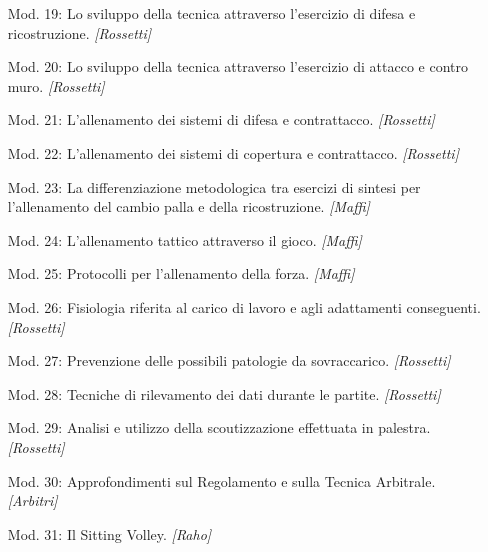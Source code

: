 \begin{itemize}
\item[Mod. 19:]Lo sviluppo della tecnica attraverso l'esercizio di difesa e ricostruzione. \emph{[Rossetti]}
\item[Mod. 20:]Lo sviluppo della tecnica attraverso l'esercizio di attacco e contro muro. \emph{[Rossetti]}
\item[Mod. 21:]L'allenamento dei sistemi di difesa e contrattacco. \emph{[Rossetti]}
\item[Mod. 22:]L'allenamento dei sistemi di copertura e contrattacco. \emph{[Rossetti]}
\item[Mod. 23:]La differenziazione metodologica tra esercizi di sintesi  per l'allenamento del cambio palla e della ricostruzione. \emph{[Maffi]}
\item[Mod. 24:]L'allenamento tattico attraverso il gioco. \emph{[Maffi]}
\item[Mod. 25:]Protocolli per l'allenamento della forza. \emph{[Maffi]}
\item[Mod. 26:]Fisiologia riferita al carico di lavoro e agli adattamenti conseguenti. \emph{[Rossetti]}
\item[Mod. 27:]Prevenzione delle possibili patologie da sovraccarico. \emph{[Rossetti]}
\item[Mod. 28:]Tecniche di rilevamento dei dati durante le partite. \emph{[Rossetti]}
\item[Mod. 29:]Analisi e utilizzo della scoutizzazione effettuata in palestra. \emph{[Rossetti]}
\item[Mod. 30:]Approfondimenti sul Regolamento e sulla Tecnica Arbitrale. \emph{[Arbitri]}
\item[Mod. 31:]Il Sitting Volley. \emph{[Raho]}
\end{itemize}